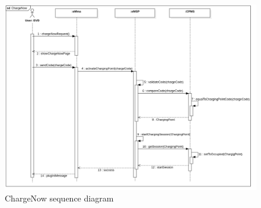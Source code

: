 \begin{figure}[H]
    \centering
    \includegraphics[width=1\textwidth]{Images/cp3/ChargeNowSD.png}
    \caption{ChargeNow sequence diagram}
\end{figure}

\clearpage
